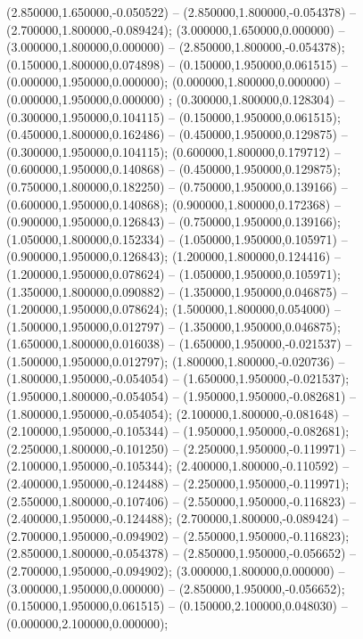  (2.850000,1.650000,-0.050522) -- (2.850000,1.800000,-0.054378) -- (2.700000,1.800000,-0.089424);
 (3.000000,1.650000,0.000000) -- (3.000000,1.800000,0.000000) -- (2.850000,1.800000,-0.054378);
 (0.150000,1.800000,0.074898) -- (0.150000,1.950000,0.061515) -- (0.000000,1.950000,0.000000);
 (0.000000,1.800000,0.000000) -- (0.000000,1.950000,0.000000) ;
 (0.300000,1.800000,0.128304) -- (0.300000,1.950000,0.104115) -- (0.150000,1.950000,0.061515);
 (0.450000,1.800000,0.162486) -- (0.450000,1.950000,0.129875) -- (0.300000,1.950000,0.104115);
 (0.600000,1.800000,0.179712) -- (0.600000,1.950000,0.140868) -- (0.450000,1.950000,0.129875);
 (0.750000,1.800000,0.182250) -- (0.750000,1.950000,0.139166) -- (0.600000,1.950000,0.140868);
 (0.900000,1.800000,0.172368) -- (0.900000,1.950000,0.126843) -- (0.750000,1.950000,0.139166);
 (1.050000,1.800000,0.152334) -- (1.050000,1.950000,0.105971) -- (0.900000,1.950000,0.126843);
 (1.200000,1.800000,0.124416) -- (1.200000,1.950000,0.078624) -- (1.050000,1.950000,0.105971);
 (1.350000,1.800000,0.090882) -- (1.350000,1.950000,0.046875) -- (1.200000,1.950000,0.078624);
 (1.500000,1.800000,0.054000) -- (1.500000,1.950000,0.012797) -- (1.350000,1.950000,0.046875);
 (1.650000,1.800000,0.016038) -- (1.650000,1.950000,-0.021537) -- (1.500000,1.950000,0.012797);
 (1.800000,1.800000,-0.020736) -- (1.800000,1.950000,-0.054054) -- (1.650000,1.950000,-0.021537);
 (1.950000,1.800000,-0.054054) -- (1.950000,1.950000,-0.082681) -- (1.800000,1.950000,-0.054054);
 (2.100000,1.800000,-0.081648) -- (2.100000,1.950000,-0.105344) -- (1.950000,1.950000,-0.082681);
 (2.250000,1.800000,-0.101250) -- (2.250000,1.950000,-0.119971) -- (2.100000,1.950000,-0.105344);
 (2.400000,1.800000,-0.110592) -- (2.400000,1.950000,-0.124488) -- (2.250000,1.950000,-0.119971);
 (2.550000,1.800000,-0.107406) -- (2.550000,1.950000,-0.116823) -- (2.400000,1.950000,-0.124488);
 (2.700000,1.800000,-0.089424) -- (2.700000,1.950000,-0.094902) -- (2.550000,1.950000,-0.116823);
 (2.850000,1.800000,-0.054378) -- (2.850000,1.950000,-0.056652) -- (2.700000,1.950000,-0.094902);
 (3.000000,1.800000,0.000000) -- (3.000000,1.950000,0.000000) -- (2.850000,1.950000,-0.056652);
 (0.150000,1.950000,0.061515) -- (0.150000,2.100000,0.048030) -- (0.000000,2.100000,0.000000);
